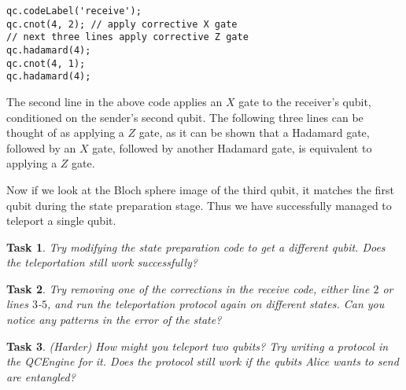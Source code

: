 \documentclass[twocolumn]{article}
\newtheorem{task}{Task}[section]
\begin{document}
\begin{lstlisting}
qc.codeLabel('receive');
qc.cnot(4, 2); // apply corrective X gate
// next three lines apply corrective Z gate
qc.hadamard(4);
qc.cnot(4, 1);
qc.hadamard(4);
\end{lstlisting}

The second line in the above code applies an $X$ gate to the receiver's qubit, conditioned on the sender's second qubit. The following three lines can be thought of as applying a $Z$ gate, as it can be shown that a Hadamard gate, followed by an $X$ gate, followed by another Hadamard gate, is equivalent to applying a $Z$ gate.

Now if we look at the Bloch sphere image of the third qubit, it matches the first qubit during the state preparation stage. Thus we have successfully managed to teleport a single qubit.

\begin{task}
Try modifying the state preparation code to get a different qubit. Does the teleportation still work successfully?
\end{task}

\begin{task}
Try removing one of the corrections in the receive code, either line $2$ or lines $3$-$5$, and run the teleportation protocol again on different states. Can you notice any patterns in the error of the state?
\end{task}

\begin{task}
(Harder) How might you teleport two qubits? Try writing a protocol in the QCEngine for it. Does the protocol still work if the qubits Alice wants to send are entangled?
\end{task}
\end{document}
